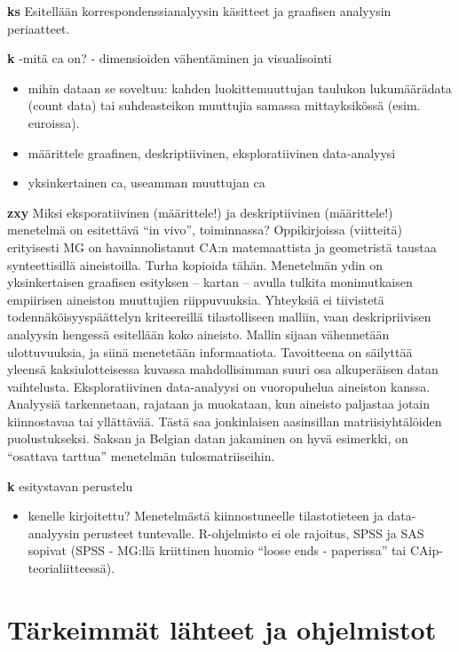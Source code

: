 \documentclass[
  finnish,
]{book}
\providecommand{\tightlist}{%
  \setlength{\itemsep}{0pt}\setlength{\parskip}{0pt}}
\begin{document}
\textbf{ks} Esitellään korrespondenssianalyysin käsitteet ja graafisen analyysin
periaatteet.

\textbf{k} -mitä ca on?
- dimensioiden vähentäminen ja visualisointi

\begin{itemize}
\item
  mihin dataan se soveltuu: kahden luokittemuuttujan taulukon lukumäärädata (count data)
  tai suhdeasteikon muuttujia samassa mittayksikössä (esim. euroissa).
\item
  määrittele graafinen, deskriptiivinen, eksploratiivinen data-analyysi
\item
  yksinkertainen ca, useamman muuttujan ca
\end{itemize}

\textbf{zxy} Miksi eksporatiivinen (määrittele!) ja deskriptiivinen (määrittele!)
menetelmä on esitettävä ``in vivo'', toiminnassa? Oppikirjoissa (viitteitä)
erityisesti MG on havainnolistanut CA:n matemaattista ja geometristä taustaa
synteettisillä aineistoilla. Turha kopioida tähän. Menetelmän ydin on
yksinkertaisen graafisen esityksen -- kartan -- avulla tulkita monimutkaisen
empiirisen aineiston muuttujien riippuvuuksia. Yhteyksiä ei tiivistetä
todennäköisyyspäättelyn kriteereillä tilastolliseen malliin, vaan deskripriivisen
analyysin hengessä esitellään koko aineisto. Mallin sijaan vähennetään ulottuvuuksia,
ja siinä menetetään informaatiota. Tavoitteena on säilyttää yleensä kaksiulotteisessa
kuvassa mahdollisimman suuri osa alkuperäisen datan vaihtelusta. Eksploratiivinen
data-analyysi on vuoropuhelua aineiston kanssa. Analyysiä tarkennetaan, rajataan
ja muokataan, kun aineisto paljastaa jotain kiinnostavaa tai yllättävää. Tästä
saa jonkinlaisen aasinsillan matriisiyhtälöiden puolustukseksi.
Saksan ja Belgian datan jakaminen on hyvä esimerkki, on ``osattava tarttua''
menetelmän tulosmatriiseihin.

\textbf{k} esitystavan perustelu

\begin{itemize}
\tightlist
\item
  kenelle kirjoitettu? Menetelmästä kiinnostuneelle tilastotieteen ja data-analyysin
  perusteet tuntevalle. R-ohjelmisto ei ole rajoitus, SPSS ja SAS sopivat
  (SPSS - MG:llä kriittinen huomio ``loose ends - paperissa'' tai CAip-teorialiitteessä).
\end{itemize}

\hypertarget{tuxe4rkeimmuxe4t-luxe4hteet-ja-ohjelmistot}{%
\section{Tärkeimmät lähteet ja ohjelmistot}\label{tuxe4rkeimmuxe4t-luxe4hteet-ja-ohjelmistot}}
\end{document}
